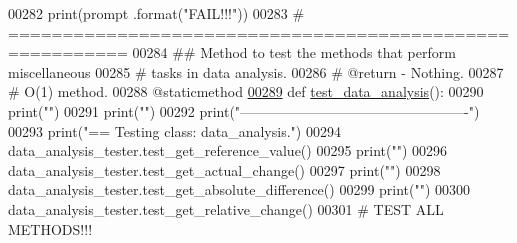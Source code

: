 \begin{DoxyCode}
00282             print(prompt .format(\textcolor{stringliteral}{"FAIL!!!"}))
00283     \textcolor{comment}{# =========================================================}
00284     \textcolor{comment}{##  Method to test the methods that perform miscellaneous}
00285     \textcolor{comment}{#       tasks in data analysis.}
00286     \textcolor{comment}{#   @return - Nothing.}
00287     \textcolor{comment}{#   O(1) method.}
00288     @staticmethod
\hypertarget{test__data__analysis__tool_8py_source_l00289}{}\hyperlink{classstatistics_1_1test__data__analysis__tool_1_1data__analysis__tester_a770fcf75cc2e1a9e8e840d1f3bb770af}{00289}     \textcolor{keyword}{def }\hyperlink{classstatistics_1_1test__data__analysis__tool_1_1data__analysis__tester_a770fcf75cc2e1a9e8e840d1f3bb770af}{test\_data\_analysis}():
00290         print(\textcolor{stringliteral}{""})
00291         print(\textcolor{stringliteral}{""})
00292         print(\textcolor{stringliteral}{"-------------------------------------------------"})
00293         print(\textcolor{stringliteral}{"==   Testing class: data\_analysis."})
00294         data\_analysis\_tester.test\_get\_reference\_value()
00295         print(\textcolor{stringliteral}{""})
00296         data\_analysis\_tester.test\_get\_actual\_change()
00297         print(\textcolor{stringliteral}{""})
00298         data\_analysis\_tester.test\_get\_absolute\_difference()
00299         print(\textcolor{stringliteral}{""})
00300         data\_analysis\_tester.test\_get\_relative\_change()
00301         \textcolor{comment}{# TEST ALL METHODS!!!}
\end{DoxyCode}
